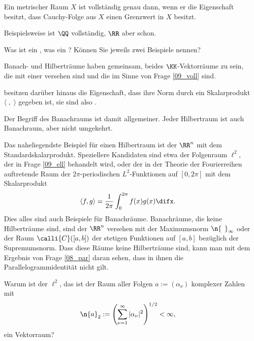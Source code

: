\begin{antwort}
  Ein metrischer Raum $X$ 
  ist vollständig genau dann, wenn er die Eigenschaft besitzt, dass 
   Cauchy-Folge aus $X$ einen Grenzwert in $X$ besitzt. 

  Beispielsweise ist $\QQ$  vollständig, $\RR$ aber schon. 
  \AntEnd
\end{antwort}



\begin{frage}\label{q:banachraum}
  Was ist ein , was ein ? 
  Können Sie jeweils zwei Beispiele nennen?
\end{frage}

\begin{antwort}
  Banach- und Hilberträume haben gemeinsam, beides 
  $\KK$-Vektorräume zu sein, die mit einer  
  versehen sind und die 
   im Sinne von Frage \ref{09_voll} sind. 

   besitzen darüber hinaus die Eigenschaft, dass 
  ihre Norm durch ein Skalarprodukt $\langle \;,\; \rangle$ gegeben ist,  
  sie sind also . 

  Der Begriff des Banachraums ist damit allgemeiner. Jeder Hilbertraum ist 
  auch Banachraum, aber nicht umgekehrt. 

  Das naheliegendste Beispiel für einen 
  Hilbertraum ist der $\RR^n$ mit dem Standard\-skalar\-produkt. 
  Speziellere Kandidaten sind etwa der Folgenraum $\ell^2$,  
  der in Frage \ref{09_ell} behandelt wird, 
  oder der in der Theorie der Fourierreihen auftretende  
  Raum der $2\pi$-periodischen $L^2$-Funktionen auf $[0,2\pi]$ mit 
  dem Skalarprodukt 
  \[
  \langle f, g \rangle = \frac{1}{2\pi} \int_{0}^{2\pi} f(x) g(x) \difx.  
  \]
  Dies alles sind auch Beispiele für Banachräume. 
  Banachräume, die keine Hilberträume sind, sind {\zB} der 
  $\RR^n$ versehen mit der Maximumsnorm 
  $\n{\,\;}_\infty$ oder der Raum $\calli{C}([a,b])$ 
  der stetigen Funktionen auf $[a,b]$ bezüglich der Supremumsnorm. 
  Dass diese Räume keine Hilberträume sind, kann man mit dem Ergebnis 
  von Frage \ref{08_par} daran sehen, dass in ihnen die Parallelogrammidentität 
  nicht gilt.
  \AntEnd
\end{antwort}

\begin{frage}\label{09_ell}
  Warum ist der  $\ell^2$, das ist der 
  Raum aller Folgen $a:=(\alpha_\nu)$ komplexer Zahlen mit 
  \[
  \n{ a }_2 := \left( \sum_{\nu=1}^\infty |\alpha_\nu|^2 \right)^{1/2} < \infty,
  \]
  ein Vektorraum?
\end{frage}


